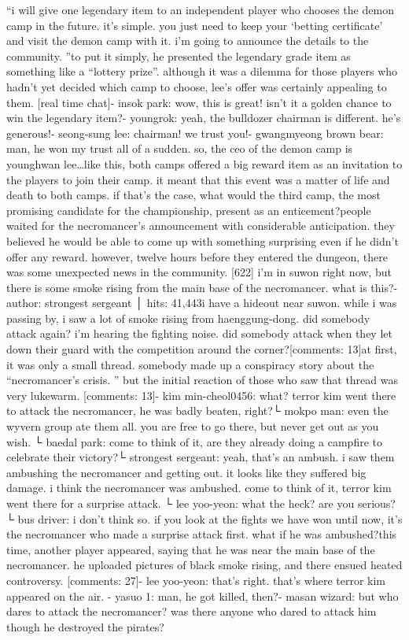 “i will give one legendary item to an independent player who chooses the demon camp in the future.
 it’s simple.
 you just need to keep your ‘betting certificate’ and visit the demon camp with it.
 i’m going to announce the details to the community.
”to put it simply, he presented the legendary grade item as something like a “lottery prize”.
although it was a dilemma for those players who hadn’t yet decided which camp to choose, lee’s offer was certainly appealing to them.
[real time chat]- insok park: wow, this is great! isn’t it a golden chance to win the legendary item?- youngrok: yeah, the bulldozer chairman is different.
 he’s generous!- seong-sung lee: chairman! we trust you!- gwangmyeong brown bear: man, he won my trust all of a sudden.
 so, the ceo of the demon camp is younghwan lee…like this, both camps offered a big reward item as an invitation to the players to join their camp.
 it meant that this event was a matter of life and death to both camps.
if that’s the case, what would the third camp, the most promising candidate for the championship, present as an enticement?people waited for the necromancer’s announcement with considerable anticipation.
they believed he would be able to come up with something surprising even if he didn’t offer any reward.
however, twelve hours before they entered the dungeon, there was some unexpected news in the community.
[622] i’m in suwon right now, but there is some smoke rising from the main base of the necromancer.
 what is this?-author: strongest sergeant │ hits: 41,443i have a hideout near suwon.
 while i was passing by, i saw a lot of smoke rising from haenggung-dong.
 did somebody attack again? i’m hearing the fighting noise.
 did somebody attack when they let down their guard with the competition around the corner?[comments: 13]at first, it was only a small thread.
 somebody made up a conspiracy story about the “necromancer’s crisis.
” but the initial reaction of those who saw that thread was very lukewarm.
[comments: 13]- kim min-cheol0456: what? terror kim went there to attack the necromancer, he was badly beaten, right?└ mokpo man: even the wyvern group ate them all.
 you are free to go there, but never get out as you wish.
└ baedal park: come to think of it, are they already doing a campfire to celebrate their victory?└ strongest sergeant: yeah, that’s an ambush.
 i saw them ambushing the necromancer and getting out.
 it looks like they suffered big damage.
 i think the necromancer was ambushed.
 come to think of it, terror kim went there for a surprise attack.
└ lee yoo-yeon: what the heck? are you serious?└ bus driver: i don’t think so.
 if you look at the fights we have won until now, it’s the necromancer who made a surprise attack first.
 what if he was ambushed?this time, another player appeared, saying that he was near the main base of the necromancer.
 he uploaded pictures of black smoke rising, and there ensued heated controversy.
[comments: 27]- lee yoo-yeon: that’s right.
 that’s where terror kim appeared on the air.
- yasuo 1: man, he got killed, then?- masan wizard: but who dares to attack the necromancer? was there anyone who dared to attack him though he destroyed the pirates?

